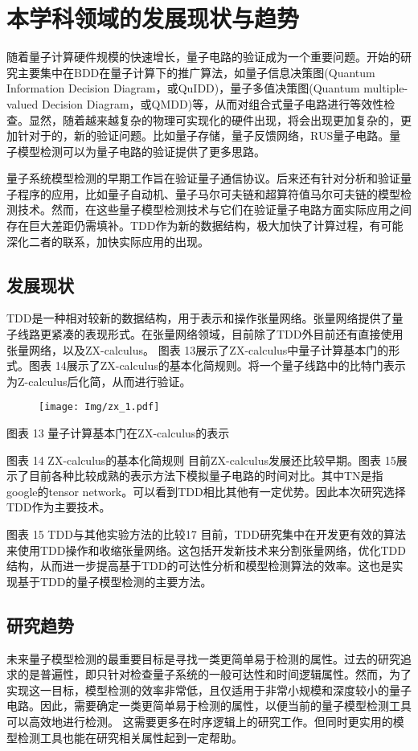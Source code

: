 \section{本学科领域的发展现状与趋势}
随着量子计算硬件规模的快速增长，量子电路的验证成为一个重要问题。开始的研究主要集中在BDD在量子计算下的推广算法，如量子信息决策图(Quantum Information Decision Diagram，或QuIDD)\citep{Viamontes_2003}，量子多值决策图(Quantum multiple-valued Decision Diagram，或QMDD)\citep{Seiter_2013}等，从而对组合式量子电路进行等效性检查。显然，随着越来越复杂的物理可实现化的硬件出现，将会出现更加复杂的，更加针对于的，新的验证问题。比如量子存储\citep{Kerckhoff_2010}，量子反馈网络\citep{Gough_2008}，RUS量子电路\citep{Bocharov_2015}。量子模型检测可以为量子电路的验证提供了更多思路。

量子系统模型检测的早期工作旨在验证量子通信协议\citep{Gay,BALTAZAR_2008,davidson2012model}。后来还有针对分析和验证量子程序的应用\citep{ying2016foundations}，比如量子自动机\citep{ying2014model}、量子马尔可夫链\citep{Ying_2013}和超算符值马尔可夫链\citep{feng2013model}的模型检测技术。然而，在这些量子模型检测技术与它们在验证量子电路方面实际应用之间存在巨大差距仍需填补。TDD作为新的数据结构，极大加快了计算过程，有可能深化二者的联系，加快实际应用的出现。
\subsection{发展现状}
TDD是一种相对较新的数据结构，用于表示和操作张量网络。张量网络提供了量子线路更紧凑的表现形式。在张量网络领域，目前除了TDD外目前还有直接使用张量网络，以及ZX-calculus\citep{van2020zx}。
图表 13展示了ZX-calculus中量子计算基本门的形式。图表 14展示了ZX-calculus的基本化简规则。将一个量子线路中的比特门表示为Z-calculus后化简，从而进行验证。

\begin{figure}[!htbp]
    \centering
    \texttt{[image: Img/zx\_1.pdf]}
\end{figure}
图表 13 量子计算基本门在ZX-calculus的表示
 
图表 14 ZX-calculus的基本化简规则
目前ZX-calculus发展还比较早期。图表 15展示了目前各种比较成熟的表示方法下模拟量子电路的时间对比。其中TN是指google的tensor network。可以看到TDD相比其他有一定优势。因此本次研究选择TDD作为主要技术。
 
图表 15 TDD与其他实验方法的比较17
目前，TDD研究集中在开发更有效的算法来使用TDD操作和收缩张量网络。这包括开发新技术来分割张量网络，优化TDD结构，从而进一步提高基于TDD的可达性分析和模型检测算法的效率。这也是实现基于TDD的量子模型检测的主要方法。
\subsection{研究趋势}
未来量子模型检测的最重要目标是寻找一类更简单易于检测的属性。过去的研究追求的是普遍性，即只针对检查量子系统的一般可达性和时间逻辑属性。然而，为了实现这一目标，模型检测的效率非常低，且仅适用于非常小规模和深度较小的量子电路。因此，需要确定一类更简单易于检测的属性，以便当前的量子模型检测工具可以高效地进行检测\citep{ying2021model}。
这需要更多在时序逻辑上的研究工作。但同时更实用的模型检测工具也能在研究相关属性起到一定帮助。
